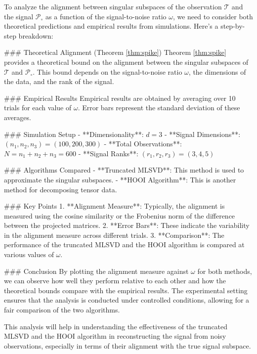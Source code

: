 To analyze the alignment between singular subspaces of the observation \(\bm{\mathscr{T}}\) and the signal \(\bm{\mathscr{P}}_\circ\) as a function of the signal-to-noise ratio \(\omega\), we need to consider both theoretical predictions and empirical results from simulations. Here's a step-by-step breakdown:

### Theoretical Alignment (Theorem \ref{thm:spike})
Theorem \ref{thm:spike} provides a theoretical bound on the alignment between the singular subspaces of \(\bm{\mathscr{T}}\) and \(\bm{\mathscr{P}}_\circ\). This bound depends on the signal-to-noise ratio \(\omega\), the dimensions of the data, and the rank of the signal.

### Empirical Results
Empirical results are obtained by averaging over 10 trials for each value of \(\omega\). Error bars represent the standard deviation of these averages.

### Simulation Setup
- **Dimensionality**: \(d = 3\)
- **Signal Dimensions**: \((n_1, n_2, n_3) = (100, 200, 300)\)
- **Total Observations**: \(N = n_1 + n_2 + n_3 = 600\)
- **Signal Ranks**: \((r_1, r_2, r_3) = (3, 4, 5)\)

### Algorithms Compared
- **Truncated MLSVD**: This method is used to approximate the singular subspaces.
- **HOOI Algorithm**: This is another method for decomposing tensor data.

### Key Points
1. **Alignment Measure**: Typically, the alignment is measured using the cosine similarity or the Frobenius norm of the difference between the projected matrices.
2. **Error Bars**: These indicate the variability in the alignment measure across different trials.
3. **Comparison**: The performance of the truncated MLSVD and the HOOI algorithm is compared at various values of \(\omega\).

### Conclusion
By plotting the alignment measure against \(\omega\) for both methods, we can observe how well they perform relative to each other and how the theoretical bounds compare with the empirical results. The experimental setting ensures that the analysis is conducted under controlled conditions, allowing for a fair comparison of the two algorithms.

This analysis will help in understanding the effectiveness of the truncated MLSVD and the HOOI algorithm in reconstructing the signal from noisy observations, especially in terms of their alignment with the true signal subspace.